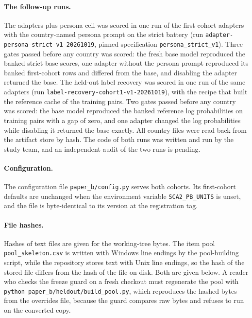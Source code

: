 \documentclass[12pt]{article}
\begin{document}
\paragraph{The follow-up runs.} The adapters-plus-persona cell was scored in one run of the first-cohort adapters with the country-named persona prompt on the strict battery (run \texttt{adapter-persona-strict-v1-20261019}, pinned specification \texttt{persona\_strict\_v1}). Three gates passed before any country was scored: the fresh base model reproduced the banked strict base scores, one adapter without the persona prompt reproduced its banked first-cohort rows and differed from the base, and disabling the adapter returned the base. The held-out label recovery was scored in one run of the same adapters (run \texttt{label-recovery-cohort1-v1-20261019}), with the recipe that built the reference cache of the training pairs. Two gates passed before any country was scored: the base model reproduced the banked reference log probabilities on training pairs with a gap of zero, and one adapter changed the log probabilities while disabling it returned the base exactly. All country files were read back from the artifact store by hash. The code of both runs was written and run by the study team, and an independent audit of the two runs is pending.

\paragraph{Configuration.} The configuration file \texttt{paper\_b/config.py} serves both cohorts. Its first-cohort defaults are unchanged when the environment variable \texttt{SCA2\_PB\_UNITS} is unset, and the file is byte-identical to its version at the registration tag.

\paragraph{File hashes.} Hashes of text files are given for the working-tree bytes. The item pool \texttt{pool\_skeleton.csv} is written with Windows line endings by the pool-building script, while the repository stores text with Unix line endings, so the hash of the stored file differs from the hash of the file on disk. Both are given below. A reader who checks the freeze guard on a fresh checkout must regenerate the pool with \texttt{python paper\_b/heldout/build\_pool.py}, which reproduces the hashed bytes from the overrides file, because the guard compares raw bytes and refuses to run on the converted copy.
\end{document}
